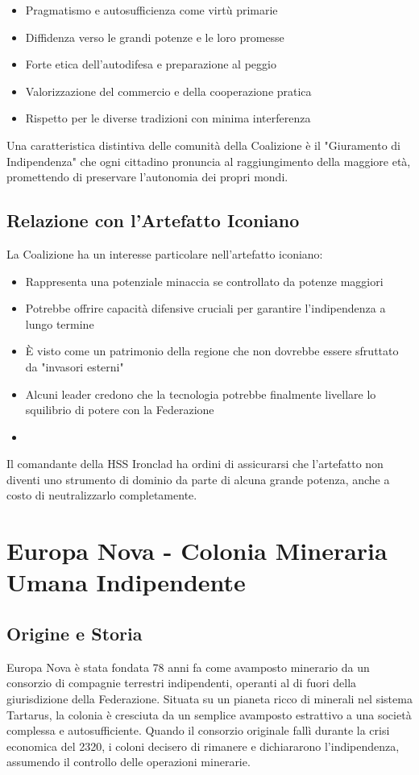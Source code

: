 \documentclass[letterpaper,twocolumn,openany,nodeprecatedcode]{dndbook}
\begin{document}
\begin{itemize}
    \item Pragmatismo e autosufficienza come virtù primarie
    \item Diffidenza verso le grandi potenze e le loro promesse
    \item Forte etica dell'autodifesa e preparazione al peggio
    \item Valorizzazione del commercio e della cooperazione pratica
    \item Rispetto per le diverse tradizioni con minima interferenza
\end{itemize}

Una caratteristica distintiva delle comunità della Coalizione è il "Giuramento di Indipendenza" che ogni cittadino pronuncia al raggiungimento della maggiore età, promettendo di preservare l'autonomia dei propri mondi.
\subsection{Relazione con l'Artefatto Iconiano}
La Coalizione ha un interesse particolare nell'artefatto iconiano:

\begin{itemize}
    \item Rappresenta una potenziale minaccia se controllato da potenze maggiori
    \item Potrebbe offrire capacità difensive cruciali per garantire l'indipendenza a lungo termine
    \item È visto come un patrimonio della regione che non dovrebbe essere sfruttato da "invasori esterni"
    \item Alcuni leader credono che la tecnologia potrebbe finalmente livellare lo squilibrio di potere con la Federazione
    \item 
\end{itemize}
Il comandante della HSS Ironclad ha ordini di assicurarsi che l'artefatto non diventi uno strumento di dominio da parte di alcuna grande potenza, anche a costo di neutralizzarlo completamente.

\section{Europa Nova - Colonia Mineraria Umana Indipendente}
\subsection{Origine e Storia}
Europa Nova è stata fondata 78 anni fa come avamposto minerario da un consorzio di compagnie terrestri indipendenti, operanti al di fuori della giurisdizione della Federazione. Situata su un pianeta ricco di minerali nel sistema Tartarus, la colonia è cresciuta da un semplice avamposto estrattivo a una società complessa e autosufficiente. Quando il consorzio originale fallì durante la crisi economica del 2320, i coloni decisero di rimanere e dichiararono l'indipendenza, assumendo il controllo delle operazioni minerarie.
\end{document}
